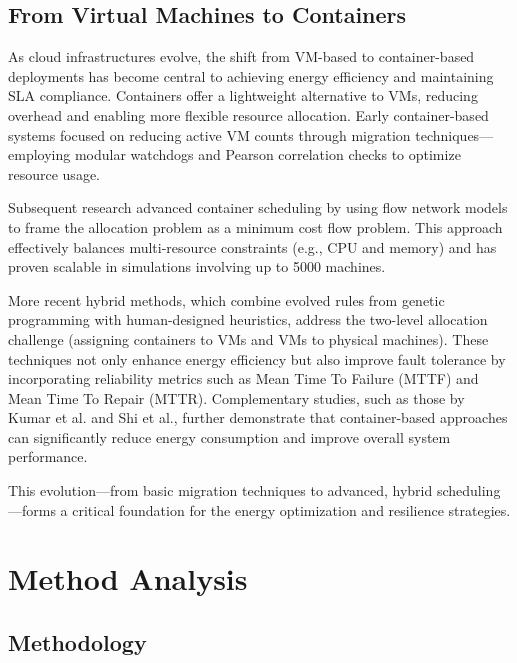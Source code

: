 \documentclass[runningheads]{llncs}
\begin{document}
\subsection{From Virtual Machines to Containers}

As cloud infrastructures evolve, the shift from VM-based to container-based deployments has become central to achieving energy efficiency and maintaining SLA compliance. Containers offer a lightweight alternative to VMs, reducing overhead and enabling more flexible resource allocation\cite{alahmad_availability-aware_2018}. Early container-based systems focused on reducing active VM counts through migration techniques—employing modular watchdogs and Pearson correlation checks to optimize resource usage\cite{alahmad_availability-aware_2018}.

Subsequent research advanced container scheduling by using flow network models to frame the allocation problem as a minimum cost flow problem. This approach effectively balances multi-resource constraints (e.g., CPU and memory) and has proven scalable in simulations involving up to 5000 machines\cite{hu_concurrent_2020}. 

More recent hybrid methods, which combine evolved rules from genetic programming with human-designed heuristics, address the two-level allocation challenge (assigning containers to VMs and VMs to physical machines). These techniques not only enhance energy efficiency but also improve fault tolerance by incorporating reliability metrics such as Mean Time To Failure (MTTF) and Mean Time To Repair (MTTR)\cite{tan_hybrid_2019, alahmad_availability-aware_2018}. Complementary studies, such as those by Kumar et al.\cite{kumar_renewable_2019} and Shi et al.\cite{shi_energy-aware_2018}, further demonstrate that container-based approaches can significantly reduce energy consumption and improve overall system performance.

This evolution—from basic migration techniques to advanced, hybrid scheduling—forms a critical foundation for the energy optimization and resilience strategies.

\section{Method Analysis}

\subsection{Methodology}
\end{document}
